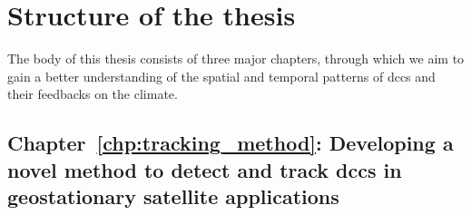 




\section{Structure of the thesis}

The body of this thesis consists of three major chapters, through which we aim to gain a better understanding of the spatial and temporal patterns of \acrshort{dcc}s and their feedbacks on the climate.


\subsection{Chapter~\ref{chp:tracking_method}: Developing a novel method to detect and track \acrshort{dcc}s in geostationary satellite applications}

